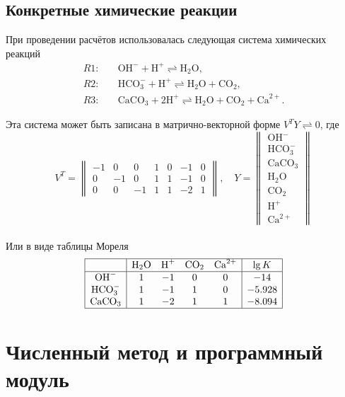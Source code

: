\documentclass[14pt,a4paper]{extarticle}
\begin{document}
\subsection{Конкретные химические реакции}

\newcommand{\OHm}{\text{OH}^-}
\newcommand{\Hp}{\text{H}^+}
\newcommand{\WAT}{\text{H}_2\text{O}}
\newcommand{\CARB}{\text{CO}_2}
\newcommand{\Catwop}{\text{Ca}^{2+}}
\newcommand{\Calcite}{\text{CaCO}_3}
\newcommand{\HCO}{\text{HCO}_3^{-}}
При проведении расчётов использовалась следующая система химических реакций
\begin{align*}
R1:&\quad \OHm + \Hp \rightleftharpoons \WAT,\\
R2:&\quad \HCO +\Hp \rightleftharpoons \WAT + \CARB,\\
R3:&\quad \Calcite + 2\Hp \rightleftharpoons \WAT + \CARB + \Catwop.
\end{align*}

Эта  система может быть записана в матрично-векторной форме $V^T Y \rightleftharpoons 0$, где
$$V^T =  \begin{Vmatrix}
-1 &0 &0  &1 &0 &-1 &0\\
0 &-1 &0  &1 &1 &-1 &0\\
0  &0 &-1  &1 &1 &-2 &1
		\end{Vmatrix}, \quad
  Y = \begin{Vmatrix}
  \OHm\\
  \HCO\\
  \Calcite\\
  \WAT\\
  \CARB\\
  \Hp\\
  \Catwop
  \end{Vmatrix}$$\\
Или в виде таблицы Мореля\\
$$\begin{array}{|c|cccc|c|}
\hline
		&\WAT	&\Hp	&\CARB	&\Catwop	&\lg {K}\\
\hline
\OHm		&1		&-1		&0		  &0		&-14\\
\HCO	&1		&-1		&1		  &0		&-5.928\\
\Calcite		&1		&-2		&1		  &1		&-8.094\\
\hline
\end{array}$$

\section{Численный метод и программный модуль}
\end{document}

